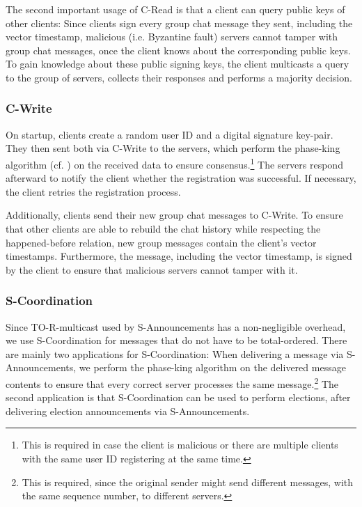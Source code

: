 \documentclass[runningheads]{llncs}
\begin{document}
The second important usage of \textsf{C-Read} is that a client can query public keys of other clients: Since clients sign every group chat message they sent, including the vector timestamp, malicious (i.e. Byzantine fault) servers cannot tamper with group chat messages, once the client knows about the corresponding public keys. To gain knowledge about these public signing keys, the client multicasts a query to the group of servers, collects their responses and performs a majority decision.

\subsubsection{C-Write}
On startup, clients create a random user ID and a digital signature key-pair. They then sent both via \textsf{C-Write} to the servers, which perform the phase-king algorithm (cf. ) on the received data to ensure consensus.\footnote{This is required in case the client is malicious or there are multiple clients with the same user ID registering at the same time.} The servers respond afterward to notify the client whether the registration was successful. If necessary, the client retries the registration process.

Additionally, clients send their new group chat messages to \textsf{C-Write}. To ensure that other clients are able to rebuild the chat history while respecting the happened-before relation, new group messages contain the client's vector timestamps. Furthermore, the message, including the vector timestamp, is signed by the client to ensure that malicious servers cannot tamper with it.

\subsubsection{S-Coordination} 
Since TO-R-multicast used by \textsf{S-Announcements} has a non-negligible overhead, we use \textsf{S-Coordination} for messages that do not have to be total-ordered. There are mainly two applications for \textsf{S-Coordination}: When delivering a message via \textsf{S-Announcements}, we perform the phase-king algorithm on the delivered message contents to ensure that every correct server processes the same message.\footnote{This is required, since the original sender might send different messages, with the same sequence number, to different servers.} The second application is that \textsf{S-Coordination} can be used to perform elections, after delivering election announcements via \textsf{S-Announcements}. 
\end{document}
